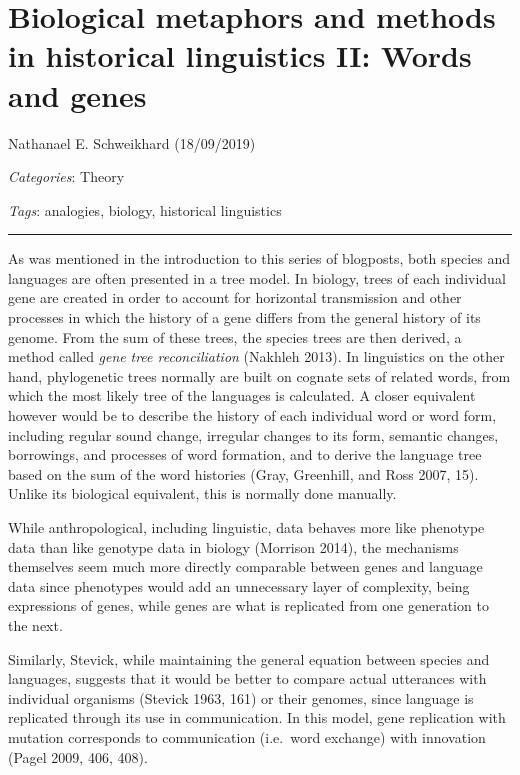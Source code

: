 \documentclass[
  a4paper,
  14pt,
  oneside,
  tablecaptionabove
]{scrbook}
\begin{document}
\newpage
\section*{Biological metaphors and methods in historical linguistics II:
Words and genes}

Nathanael E. Schweikhard  (18/09/2019)

\emph{Categories}: Theory

\emph{Tags}: analogies, biology, historical linguistics

\begin{center}\rule{0.5\linewidth}{1pt}\end{center}


As was mentioned in the introduction to this series of blogposts, both
species and languages are often presented in a tree model. In biology,
trees of each individual gene are created in order to account for
horizontal transmission and other processes in which the history of a
gene differs from the general history of its genome. From the sum of
these trees, the species trees are then derived, a method called
\emph{gene} \emph{tree reconciliation} (Nakhleh 2013). In linguistics on
the other hand, phylogenetic trees normally are built on cognate sets of
related words, from which the most likely tree of the languages is
calculated. A closer equivalent however would be to describe the history
of each individual word or word form, including regular sound change,
irregular changes to its form, semantic changes, borrowings, and
processes of word formation, and to derive the language tree based on
the sum of the word histories (Gray, Greenhill, and Ross 2007, 15).
Unlike its biological equivalent, this is normally done manually.

While anthropological, including linguistic, data behaves more like
phenotype data than like genotype data in biology (Morrison 2014), the
mechanisms themselves seem much more directly comparable between genes
and language data since phenotypes would add an unnecessary layer of
complexity, being expressions of genes, while genes are what is
replicated from one generation to the next.

Similarly, Stevick, while maintaining the general equation between
species and languages, suggests that it would be better to compare
actual utterances with individual organisms (Stevick 1963, 161) or their
genomes, since language is replicated through its use in communication.
In this model, gene replication with mutation corresponds to
communication (i.e.~word exchange) with innovation (Pagel 2009, 406,
408).
\end{document}
